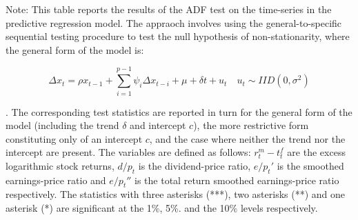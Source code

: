 \documentclass[harvard,11pt]{article}
\begin{document}
\begin{table}[!hbtp]
Note: This table reports the results of the ADF test on the time-series in the predictive regression model. The appraoch involves using the general-to-specific sequential testing procedure to test the null hypothesis of non-stationarity, where the general form of the model is:
\begin{minipage}{\linewidth}
\begin{equation*}
\Delta x_t=\rho x_{t-1}+\sum\limits_{i=1}^{p-1}\psi_i\Delta x_{t-i}+\mu+\delta t+u_t\quad u_t\sim IID(0,\sigma^2)
\end{equation*}
\end{minipage}. 
The corresponding test statistics are reported in turn for the general form of the model (including the trend $\delta$ and intercept $c$), the more restrictive form constituting only of an intercept $c$, and the case where neither the trend nor the intercept are present. The variables are defined as follows: $r_t^m-t_t^f$ are the excess logarithmic stock returns, $d/p_t$ is the dividend-price ratio, $e/p_t'$ is the smoothed earnings-price ratio and $e/p_t''$ is the total return smoothed earnings-price ratio respectively. The statistics with three asterisks (***), two asterisks (**) and one asterisk (*) are significant at the 1\%, 5\%. and the 10\% levels respectively.
\label{tabu: ADF}
\end{table}
\end{document}
